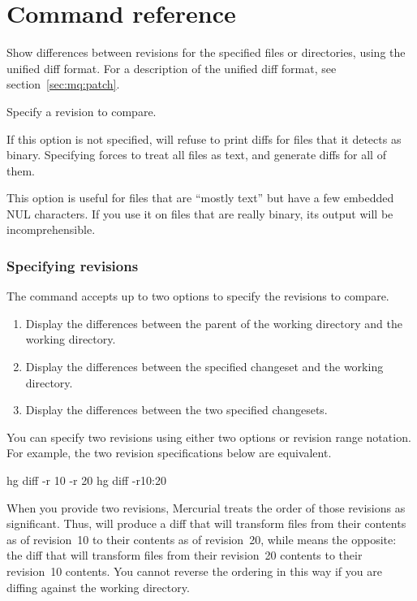 \chapter{Command reference}
\label{cmdref}


Show differences between revisions for the specified files or
directories, using the unified diff format.  For a description of the
unified diff format, see section~\ref{sec:mq:patch}.


Specify a revision to compare.


If this option is not specified,  will refuse to print
diffs for files that it detects as binary. Specifying 
forces  to treat all files as text, and generate diffs for
all of them.

This option is useful for files that are ``mostly text'' but have a
few embedded NUL characters.  If you use it on files that are really
binary, its output will be incomprehensible.

\subsection{Specifying revisions}

The  command accepts up to two  options to
specify the revisions to compare.

\begin{enumerate}
\setcounter{enumi}{0}
\item Display the differences between the parent of the working
  directory and the working directory.
\item Display the differences between the specified changeset and the
  working directory.
\item Display the differences between the two specified changesets.
\end{enumerate}

You can specify two revisions using either two 
options or revision range notation.  For example, the two revision
specifications below are equivalent.
\begin{codesample2}
  hg diff -r 10 -r 20
  hg diff -r10:20
\end{codesample2}

When you provide two revisions, Mercurial treats the order of those
revisions as significant.  Thus,  will
produce a diff that will transform files from their contents as of
revision~10 to their contents as of revision~20, while
 means the opposite: the diff that will
transform files from their revision~20 contents to their revision~10
contents.  You cannot reverse the ordering in this way if you are
diffing against the working directory.

